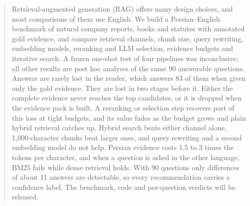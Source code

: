 \begin{abstract}
Retrieval-augmented generation (RAG) offers many design choices, and most comparisons of them use English. We build a Persian--English benchmark of natural company reports, books and statutes with annotated gold evidence, and compare retrieval channels, chunk size, query rewriting, embedding models, reranking and LLM selection, evidence budgets and iterative search. A frozen one-shot test of four pipelines was inconclusive; all other results are post hoc analyses of the same 90 answerable questions. Answers are rarely lost in the reader, which answers 83 of them when given only the gold evidence. They are lost in two stages before it. Either the complete evidence never reaches the top candidates, or it is dropped when the evidence pack is built. A reranking or selection step recovers part of this loss at tight budgets, and its value fades as the budget grows and plain hybrid retrieval catches up. Hybrid search beats either channel alone, 1,000-character chunks beat larger ones, and query rewriting and a second embedding model do not help. Persian evidence costs 1.5 to 3 times the tokens per character, and when a question is asked in the other language, BM25 fails while dense retrieval holds. With 90 questions only differences of about 11 answers are detectable, so every recommendation carries a confidence label. The benchmark, code and per-question verdicts will be released.

\end{abstract}
